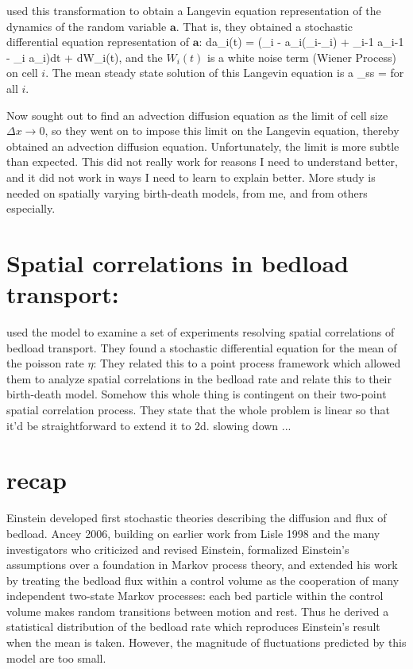 \citet{Ancey2014, Ancey2015} used this transformation to obtain a Langevin equation representation of the dynamics of the random variable $\textbf{a}$.
That is, they obtained a stochastic differential equation representation of $\textbf{a}$: 
\be da_i(t) = (\lambda_i - a_i(\sigma_i-\mu_i) + \nu_{i-1} a_{i-1} - \nu_i a_i)dt + dW_i(t),\ee
and the $W_i(t)$ is a white noise term (Wiener Process) on cell $i$. 
The mean steady state solution of this Langevin equation is 
\be \bra a \ket_ss = \frac{\lambda}{\sigma-\mu} \ee 
for all $i$. 

Now \citet{Ancey2014,Ancey2015} sought out to find an advection diffusion equation as the limit of cell size $\Delta x \rightarrow 0$, so they went on to impose this limit on the Langevin equation, thereby obtained an advection diffusion equation. 
Unfortunately, the limit is more subtle than expected. 
This did not really work for reasons I need to understand better, and it did not work in ways I need to learn to explain better. 
More study is needed on spatially varying birth-death models, from me, and from others especially.

\section{Spatial correlations in bedload transport: } 

\citet{Heyman2014} used the \citet{Ancey2014} model to examine a set of experiments resolving spatial correlations of bedload transport. 
They found a stochastic differential equation for the mean of the poisson rate $\eta$: 
They related this to a point process framework which allowed them to analyze spatial correlations in the bedload rate and relate this to their birth-death model. 
Somehow this whole thing is contingent on their two-point spatial correlation process. 
They state that the whole problem is linear so that it'd be straightforward to extend it to 2d. 
slowing down ... 

\section{recap} 
Einstein developed first stochastic theories describing the diffusion and flux of bedload. 
Ancey 2006, building on earlier work from Lisle 1998 and the many investigators who criticized and revised Einstein, formalized Einstein's assumptions over a foundation in Markov process theory, and extended his work by treating the bedload flux within a control volume as the cooperation of many independent two-state Markov processes: each bed particle within the control volume makes random transitions between motion and rest. 
Thus he derived a statistical distribution of the bedload rate which reproduces Einstein's result when the mean is taken. 
However, the magnitude of fluctuations predicted by this model are too small. 

